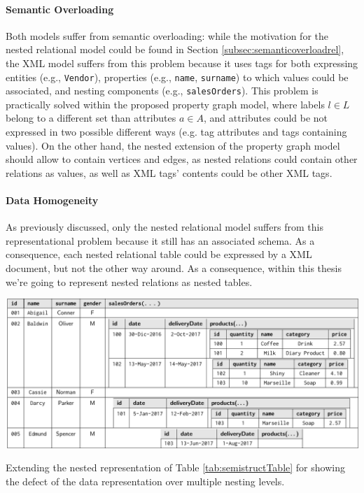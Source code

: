 \paragraph*{Semantic Overloading} Both models suffer from  semantic overloading: while the motivation for the nested relational model could be  found in Section \vref{subsec:semanticoverloadrel}, the XML model suffers from this problem because it uses tags for both expressing entities (e.g., \texttt{Vendor}), properties (e.g., \texttt{name}, \texttt{surname}) to which values could be associated, and nesting components (e.g., \texttt{salesOrders}). This problem is practically solved within the proposed property graph model, where labels $l\in L$ belong to a different set than attributes $a\in A$, and attributes could be not expressed in two possible different ways (e.g. tag attributes and tags containing values). On the other hand, the nested extension of the property graph model should allow to contain vertices and edges, as nested relations could contain other relations as values, as well as XML tags' contents could be other XML tags.

\paragraph*{Data Homogeneity} As previously discussed, only the nested relational model suffers from this representational problem because it still has an associated schema. As a consequence, each nested relational table could be expressed by a XML document, but not the other way around. As a consequence, within this thesis we're going to represent nested relations as nested tables.


\begin{table}[!t]
\centering
\includegraphics[scale=0.7]{fig/02models/02nestedaggrSales.pdf}
\caption{Extending the nested representation of Table \ref{tab:semistructTable} for showing the defect of the data representation over multiple nesting levels.}
\label{tab:semistructTableMultipleNest}
\end{table}
